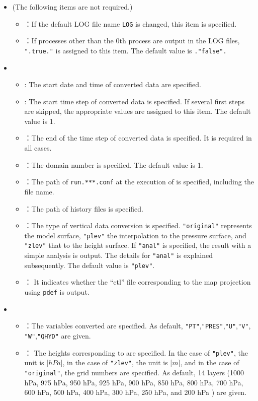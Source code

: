 \begin{itemize}
 \item {} (The following items are not required.)
 \begin{itemize}
  \item {}：If the default LOG file name \verb|LOG| is changed, this item is specified.
  \item {}：If processes other than the 0th process are output in the LOG files,
\verb|".true."| is assigned to this item.  The default value is \verb|."false".|
 \end{itemize}
 \item {}
 \begin{itemize}
  \item {} : The start date and time of converted \netcdf data are specified.
  \item {} : The start time step of converted \netcdf data is specified.
    If several first steps are skipped, the appropriate values are assigned to this item.
    The default value is 1.
  \item {}：The end of the time step of converted \netcdf data is specified.
    It is required in all cases.
  \item {}：The domain number is specified. The default value is 1.
  \item {}：The path of \verb|run.***.conf| at the execution of \scalerm is specified, including the file name.
  \item {}：The path of history files is specified.
  \item {}：The type of vertical data conversion is specified. \verb|"original"| represents the model surface, 
    \verb|"plev"| the interpolation to the pressure surface, 
    and \verb|"zlev"| that to the height surface.
    If \verb|"anal"| is specified, the result with a simple analysis is output. The details for \verb|"anal"| is explained subsequently. 
    The default value is \verb|"plev"|.
  \item {}： It indicates whether the ``ctl'' file corresponding to the map projection using \verb|pdef| is output.
 \end{itemize}
 \item {}
 \begin{itemize}
  \item {}：The variables converted are specified.
    As default, \verb|"PT"|,\verb|"PRES"|,\verb|"U"|,\verb|"V"|, \verb|"W"|,\verb|"QHYD"| are given.
  \item {}： The heights corresponding to  are specified.
    In the case of \verb|"plev"|, the unit is [$hPa$], 
    in the case of \verb|"zlev"|, the unit is [$m$], and 
    in the case of \verb|"original"|, the grid numbers are specified.
    As default, 14 layers (1000 hPa, 975 hPa, 950 hPa, 925 hPa, 900 hPa, 850 hPa, 800 hPa, 700 hPa, 600 hPa, 500 hPa, 400 hPa,
        300 hPa, 250 hPa, and 200 hPa ) are given.
 \end{itemize}
\end{itemize}


